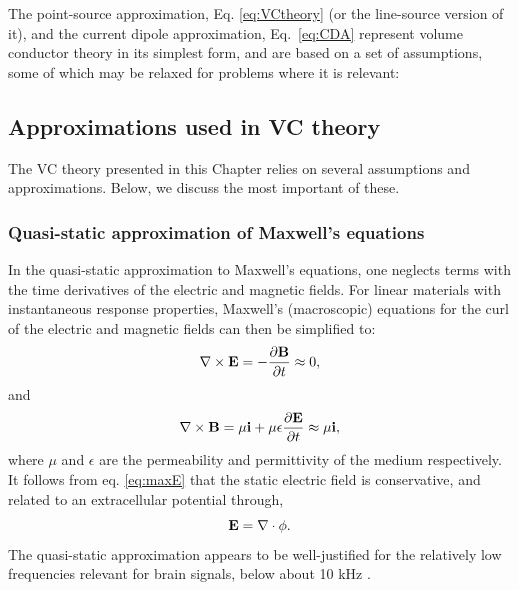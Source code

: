 The point-source approximation, Eq. \ref{eq:VCtheory} (or the line-source version of it), and the current dipole approximation, Eq.~\eqref{eq:CDA} represent volume conductor theory in its simplest form, and are based on a set of assumptions, some of which may be relaxed for problems where it is relevant: 


\subsection{Approximations used in VC theory}
\label{sec:approximations}
The VC theory presented in this Chapter relies on several assumptions and approximations. Below, we discuss the most important of these. 

\subsubsection{Quasi-static approximation of Maxwell's equations}
\label{sec:quasistatic}
In the quasi-static approximation to Maxwell's equations, one neglects terms with the time derivatives of the electric and magnetic fields. For linear materials with instantaneous response properties, Maxwell's (macroscopic) equations for the curl of the electric and magnetic fields can then be simplified to:
\begin{equation}
\nabla \times {\bf E} = - \frac{\partial {\bf B}}{\partial t}  \approx 0, 
\label{eq:maxE}
\end{equation}
and
\begin{equation}
\nabla \times {\bf B} = \mu{\bf i} + \mu \epsilon \frac{\partial {\bf E}}{\partial t} \approx  \mu {\bf i} ,
\label{eq:maxB}
\end{equation}
where $\mu$ and $\epsilon$ are the permeability and permittivity of the medium respectively. It follows from eq. \ref{eq:maxE} that the static electric field is conservative, and related to an extracellular potential through,
\begin{equation}
{\bf E} = \nabla \cdot \phi.
\label{eq:conservative}
\end{equation}
The quasi-static approximation appears to be well-justified for the relatively low frequencies relevant for brain signals, below about 10 kHz \cite{Nunez2006, Grodzinsky2011}.


